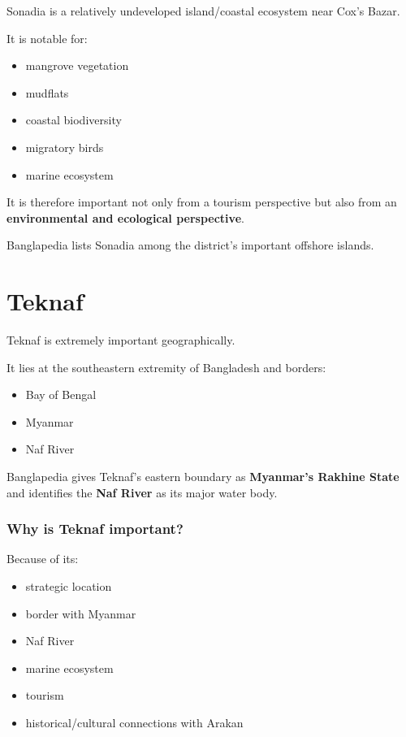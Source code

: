 Sonadia is a relatively undeveloped island/coastal ecosystem near Cox's Bazar.

It is notable for:

\begin{itemize}
  \item mangrove vegetation
  \item mudflats
  \item coastal biodiversity
  \item migratory birds
  \item marine ecosystem
\end{itemize}

It is therefore important not only from a tourism perspective but also from an \textbf{environmental and ecological perspective}.

Banglapedia lists Sonadia among the district's important offshore islands.

\medskip

\section{Teknaf}

Teknaf is extremely important geographically.

It lies at the southeastern extremity of Bangladesh and borders:

\begin{itemize}
  \item Bay of Bengal
  \item Myanmar
  \item Naf River
\end{itemize}

Banglapedia gives Teknaf's eastern boundary as \textbf{Myanmar's Rakhine State} and identifies the \textbf{Naf River} as its major water body.

\subsubsection{Why is Teknaf important?}

Because of its:

\begin{itemize}
  \item strategic location
  \item border with Myanmar
  \item Naf River
  \item marine ecosystem
  \item tourism
  \item historical/cultural connections with Arakan
\end{itemize}

